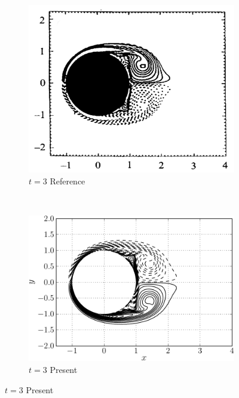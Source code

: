 \begin{figure}[p]
     \begin{subfigure}[t]{0.45\textwidth}
             \includegraphics[height=0.2\textheight]{figures/eulerian/ISC_vorticityContours_t3_ref-mod.png}
             \caption{$t=3$ Reference}
             \label{fig:ISC_vorticityContours_t3_ref}
     \end{subfigure}%
     ~ %
     \begin{subfigure}[t]{0.45\textwidth}
             \includegraphics[height=0.2\textheight]{figures/eulerian/ISC_vorticityContours_t3-crop.pdf}
             \caption{$t=3$ Present}
             \label{fig:ISC_vorticityContours_t3-crop}
     \end{subfigure} 
     

\end{figure}
